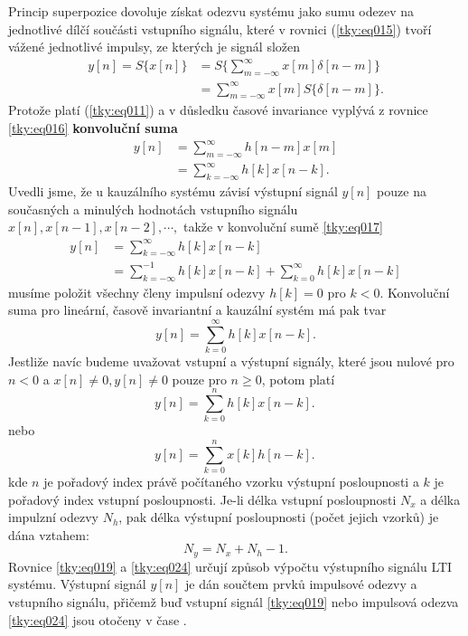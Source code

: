       Princip superpozice dovoluje získat odezvu systému jako sumu odezev na jednotlivé dílčí
      součásti vstupního signálu, které v rovnici (\ref{tky:eq015}) tvoří vážené jednotlivé impulsy,
      ze kterých je signál složen
      \begin{align}
        y[n]=S\{x[n]\}
          &=S\{\sum_{m=-\infty}^{\infty}x[m]\delta[n-m]\}  \nonumber \\
          &=\sum_{m=-\infty}^{\infty}x[m]S\{\delta[n-m]\}. \label{tky:eq016}
      \end{align}
      Protože platí (\ref{tky:eq011}) a v důsledku časové invariance vyplývá z rovnice
      \ref{tky:eq016} \textbf{konvoluční suma} 
      \begin{align}
        y[n]&=\sum_{m=-\infty}^{\infty}h[n-m]x[m]               \nonumber \\
            &=\sum_{k=-\infty}^{\infty}h[k]x[n-k].              \label{tky:eq017}
      \end{align}
      Uvedli jsme, že u kauzálního systému závisí výstupní signál $y[n]$ pouze na současných a
      minulých hodnotách vstupního signálu $x[n], x[n-1], x[n-2], \cdots ,$ takže v konvoluční sumě
      \ref{tky:eq017}
      \begin{align*}
        y[n]&=\sum_{k=-\infty}^{\infty}h[k]x[n-k]              \\               
            &=\sum_{k=-\infty}^{-1}h[k]x[n-k] + \sum_{k=0}^{\infty}h[k]x[n-k]  
      \end{align*}
      musíme položit všechny členy impulsní odezvy $h[k]=0$ pro $k<0$. Konvoluční suma pro
      lineární, časově invariantní a kauzální systém má pak tvar
      \begin{equation}\label{tky:eq018}
        y[n]=\sum_{k=0}^{\infty}h[k]x[n-k].
      \end{equation}
      Jestliže navíc budeme uvažovat vstupní a výstupní signály, které jsou nulové pro $n<0$ a
      $x[n]\neq0, y[n]\neq0$ pouze pro $n\geq0$, potom platí
      \begin{equation}\label{tky:eq019}
        \boxed{y[n]=\sum_{k=0}^{n}h[k]x[n-k].\,}
      \end{equation}
      nebo
      \begin{equation}\label{tky:eq024}
        \boxed{y[n]=\sum_{k=0}^{n}x[k]h[n-k].\,}
      \end{equation}
      kde \(n\) je pořadový index právě počítaného vzorku výstupní posloupnosti a \(k\) je pořadový
      index vstupní posloupnosti. Je-li délka vstupní posloupnosti \(N_x\) a délka impulzní odezvy
      \(N_h\), pak délka výstupní posloupnosti (počet jejich vzorků) je dána vztahem:
      \begin{equation}\label{tky:eq025}
        N_y = N_x + N_h - 1.
      \end{equation}
      Rovnice \ref{tky:eq019} a \ref{tky:eq024} určují způsob výpočtu výstupního signálu \textsc{LTI}
      systému. Výstupní signál \(y[n]\) je dán součtem prvků impulsové odezvy a vstupního signálu,
      přičemž buď vstupní signál \ref{tky:eq019} nebo impulsová odezva \ref{tky:eq024} jsou otočeny
      v čase \cite[s.~14]{Davidek1996}.
      
